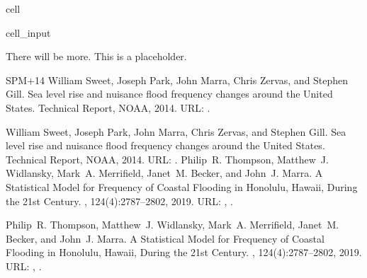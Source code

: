 \documentclass[letterpaper,10pt,english]{jupyterBook}
\begin{document}
\begin{sphinxuseclass}{cell}\begin{sphinxVerbatimInput}

\begin{sphinxuseclass}{cell_input}
\begin{sphinxVerbatim}[commandchars=\\\{\}]
\end{sphinxVerbatim}

\end{sphinxuseclass}\end{sphinxVerbatimInput}

\end{sphinxuseclass}
\sphinxAtStartPar
There will be more. This is a placeholder.

\begin{sphinxthebibliography}{SPM+14}
\sphinxAtStartPar
William Sweet, Joseph Park, John Marra, Chris Zervas, and Stephen Gill. Sea level rise and nuisance flood frequency changes around the United States. Technical Report, NOAA, 2014. URL: .

\sphinxAtStartPar
William Sweet, Joseph Park, John Marra, Chris Zervas, and Stephen Gill. Sea level rise and nuisance flood frequency changes around the United States. Technical Report, NOAA, 2014. URL: .
\sphinxAtStartPar
Philip R. Thompson, Matthew J. Widlansky, Mark A. Merrifield, Janet M. Becker, and John J. Marra. A Statistical Model for Frequency of Coastal Flooding in Honolulu, Hawaii, During the 21st Century. , 124(4):2787–2802, 2019. URL: , .

\sphinxAtStartPar
Philip R. Thompson, Matthew J. Widlansky, Mark A. Merrifield, Janet M. Becker, and John J. Marra. A Statistical Model for Frequency of Coastal Flooding in Honolulu, Hawaii, During the 21st Century. , 124(4):2787–2802, 2019. URL: , .
\end{sphinxthebibliography}







\renewcommand{\indexname}{Index}
\printindex
\end{document}
